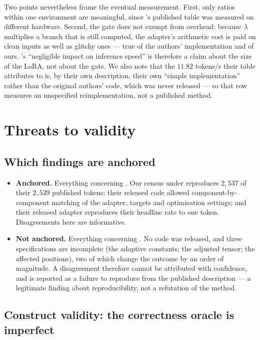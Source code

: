 Two points nevertheless frame the eventual measurement. First, only ratios within
one environment are meaningful, since \gc{}'s published table was measured on
different hardware. Second, the gate does not exempt \gc{} from overhead: because
$\lambda$ multiplies a branch that is still computed, the adapter's arithmetic
cost is paid on clean inputs as well as glitchy ones --- true of the authors'
implementation and of ours. \gc{}'s ``negligible impact on inference speed'' is
therefore a claim about the size of the LoRA, not about the gate. We also note
that the $11.82$ tokens/s their table attributes to \gp{} is, by their own
description, their own ``simple \gp{} implementation'' rather than the original
authors' code, which was never released --- so that row measures an unspecified
reimplementation, not a published method.

\section{Threats to validity}
\label{sec:threats}

\subsection{Which findings are anchored}

\begin{itemize}[leftmargin=*]
\item \textbf{Anchored.} Everything concerning \gc{}. Our census under \Pcode{}
reproduces $2{,}537$ of their $2{,}539$ published tokens; their released code
allowed component-by-component matching of the adapter, targets and optimisation
settings; and their released adapter reproduces their headline rate to one token.
Disagreements here are informative.
\item \textbf{Not anchored.} Everything concerning \gp{}. No code was released,
and three specifications are incomplete (the adaptive constants; the adjusted
tensor; the affected positions), two of which change the outcome by an order of
magnitude. A disagreement therefore cannot be attributed with confidence, and is
reported as a failure to reproduce from the published description --- a
legitimate finding about reproducibility, not a refutation of the method.
\end{itemize}

\subsection{Construct validity: the correctness oracle is imperfect}

